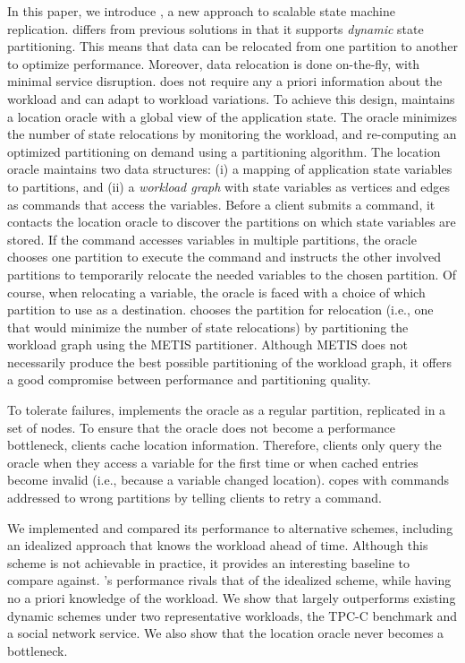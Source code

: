 In this paper, we introduce \dynastar, a new approach to scalable state machine replication.
\dynastar differs from previous solutions in that it supports \emph{dynamic} state partitioning.
This means that data can be relocated from one partition to another to optimize performance.
Moreover, data relocation is done on-the-fly, with minimal service disruption.
\dynastar does not require any a priori information about the workload and can adapt to workload variations.
To achieve this design, \dynastar maintains a
location oracle with a global view of the application state.  The oracle minimizes the
number of state relocations by monitoring the workload, and
re-computing an optimized partitioning on demand using a 
partitioning algorithm.  
The location oracle maintains two data structures: (i) a mapping of application state variables to partitions, and (ii) a \emph{workload graph} with state variables as vertices and edges as commands that access the variables.  
Before a client submits a command, it contacts the
location oracle to discover the partitions on which state variables are
stored.  If the command accesses variables in multiple partitions, the
oracle chooses one partition to execute the command and instructs the other involved partitions to temporarily relocate 
the needed variables to the chosen partition. Of course, when relocating a variable, the oracle
is faced with a choice of which partition to use as a destination.
\dynastar chooses the partition for relocation (i.e., one that
would minimize the number of state relocations) by partitioning the
workload graph using the METIS partitioner.
Although METIS does not necessarily produce the best possible partitioning of the workload graph, it offers a good compromise between performance and partitioning quality.

To tolerate failures, \dynastar implements the oracle as a regular partition, replicated in a set of nodes.
To ensure that the oracle does not become a performance bottleneck, clients cache location information.
Therefore, clients only query the oracle when they access a variable for the first time or when cached entries become invalid (i.e., because a variable changed location).
\dynastar copes with commands addressed to wrong partitions by telling clients to retry a command.

We implemented \dynastar and compared its performance to
alternative schemes, including an idealized approach that knows the workload ahead of time.
Although this scheme is not achievable in practice, it provides an interesting baseline to compare against.
\dynastar's performance rivals that of the idealized scheme, while having no a priori knowledge of the workload.
We show that \dynastar largely outperforms existing dynamic schemes under two representative workloads, the TPC-C benchmark and a social network service.
We also show that the location oracle never becomes a bottleneck.


